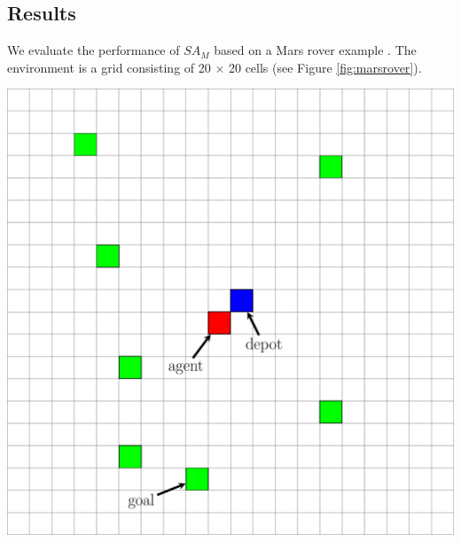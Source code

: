 \documentclass[a0, portrait]{a0poster}
\newcommand{\SAM}{\emph{$SA_M$}\xspace}
\begin{document}
\begin{multicols}{3}

\section*{Results}
We evaluate the performance of \SAM based on a Mars rover example \cite{DuffHT06}. The environment is a grid consisting of 20 $\times$ 20 cells (see Figure \ref{fig:marsrover}).

\begin{center}\vspace{1cm}
\includegraphics[scale=1]{./figs/mg_example.pdf}
\label{fig:marsrover}
\end{center}\vspace{1cm}
%
% 
% 
%


\end{multicols}
\end{document}
